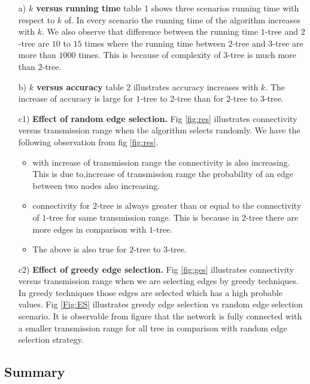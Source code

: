 \documentclass[12pt]{article}
\begin{document}
\begin{itemize}
\item[a)] \textbf{$k$ versus running time} table 1 shows three scenarios running time with respect to $k$ of. In every scenario the running time of the algorithm increases with $k$. We also observe that difference between the running time $1$-tree and $2$-tree are $10$ to $15$ times where the running time between $2$-tree and $3$-tree are more than $1000$ times. This is because of complexity of $3$-tree is much more than $2$-tree.\\
\item [b)]\textbf{$k$ versus accuracy}
table 2 illustrates accuracy increases with $k$. The increase of accuracy is large for $1$-tree to $2$-tree than for $2$-tree to $3$-tree. 

\item [c1)] \textbf{Effect of random edge selection.} Fig \ref{fig:res} illustrates connectivity versus transmission range when the algorithm selects randomly. We have the following observation from fig \ref{fig:res}.

 
\begin{itemize}[noitemsep,nolistsep]
\item with increase of transmission range the connectivity is also increasing. This is due to,increase of transmission range the probability of an edge between two nodes also increasing.
\item connectivity for $2$-tree is always greater than or equal to the connectivity of $1$-tree for same transmission range. This is because in $2$-tree there are more edges in comparison with $1$-tree.
\item The above is also true for $2$-tree to $3$-tree.
\end{itemize}
\item [c2)]\textbf{Effect of greedy edge selection.} Fig \ref{fig:ges} illustrates connectivity versus transmission range when we are selecting edges by greedy techniques. In greedy techniques those edges are selected which has a high probable values. Fig \ref{Fig:ES} illustrates greedy edge selection vs random edge selection scenario.  It is observable from figure that the network is fully connected with a smaller transmission range for all tree in comparison with random edge selection strategy.
\end{itemize}
\subsection{Summary}
\end{document}
